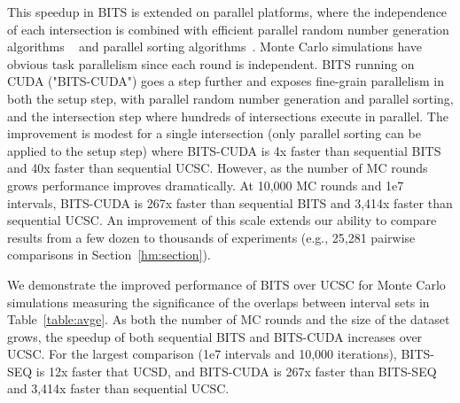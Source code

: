 \documentclass{bioinfo}
\begin{document}
This speedup in BITS is extended on parallel platforms, where the independence
of each intersection is combined with efficient parallel random number
generation algorithms ~\citep{tzeng2008} and parallel sorting
algorithms~\citep{merrill2011,satish2009}.  Monte Carlo simulations have obvious
task parallelism since each round is independent.  BITS running on CUDA 
("BITS-CUDA") goes a step further and exposes fine-grain parallelism in both the 
setup step, with
parallel random number generation and parallel sorting, and the intersection
step where hundreds of intersections execute in parallel.  The improvement is
modest for a single intersection (only parallel sorting can be applied to the
setup step) where BITS-CUDA is 4x faster than sequential BITS and 40x faster
than sequential UCSC.  However, as the number of MC rounds grows performance
improves dramatically.  At 10,000 MC rounds and 1e7 intervals, BITS-CUDA is 267x
faster than sequential BITS and 3,414x faster than sequential UCSC.  An
improvement of this scale extends our ability to compare results from a few
dozen to thousands of experiments (e.g., 25,281 pairwise comparisons in
Section~\ref{hm:section}).

We demonstrate the improved performance of BITS over UCSC for Monte Carlo
simulations measuring the significance of the overlaps between interval sets in
Table~\ref{table:avge}.  As both the number of MC rounds and the size of
the dataset grows, the speedup of both sequential BITS and BITS-CUDA increases
over UCSC.  For the largest comparison (1e7 intervals and 10,000 iterations),
BITS-SEQ is 12x faster that UCSD, and BITS-CUDA is 267x
faster than BITS-SEQ and 3,414x faster than sequential UCSC.

\end{document}
